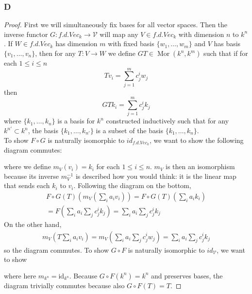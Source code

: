 \documentclass{article}
\newcommand{\id}{\mathrm{id}}
\DeclareMathOperator{\Mor}{\mathrm{Mor}}
\begin{document}
\subsubsection{D}\label{1.2.D}
\begin{proof}
    First we will simultaneously fix bases for all vector spaces. Then the inverse functor $G:f.d.Vec_k\to \mathscr V$ will map any $V\in f.d.Vec_k$ with dimension $n$ to $k^n$. If $W\in f.d.Vec_k$ has dimension $m$ with fixed basis $\{w_1,\dots,w_m\}$ and $V$ has basis $\{v_1,\dots,v_n\}$, then for any $T:V\to W$ we define $GT\in \Mor(k^n,k^m)$ such that if for each $1\le i \le n$
    \[
    Tv_i=\sum_{j=1}^m c^i_j w_j
    \]
    then
    \[
    GTk_i=\sum_{j=1}^m c^i_j k_j
    \]
    where $\{k_1,\dots, k_n\}$ is a basis for $k^n$ constructed inductively such that for any $k^{n'}\subset k^n$, the basis $\{k_1,\dots, k_{n'}\}$ is a subset of the basis $\{k_1,\dots, k_n\}$.\\
    \newline
    To show $F\circ G$ is naturally isomorphic to $id_{f.d.Vec_k}$, we want to show the following diagram commutes:
    \begin{center}
    \end{center}
    where we define $m_V(v_i)=k_i$ for each $1\le i\le n$. $m_V$ is then an isomorphism because its inverse $m_V^{-1}$ is described how you would think: it is the linear map that sends each $k_i$ to $v_i$.  Following the diagram on the bottom,
    \begin{align*}
        F\circ G(T)(m_V(\sum_i a_iv_i))=F\circ G(T)(\sum_i a_ik_i)\\
        =F(\sum_i a_i \sum_j c^i_j k_j)=\sum_i a_i \sum_j c^i_j k_j
    \end{align*}
    On the other hand,
    \begin{align*}
        m_V(T\sum_i a_iv_i)=m_V(\sum_i a_i \sum_j c^i_j w_j)=\sum_i a_i \sum_j c^i_jk_j
    \end{align*}
    so the diagram commutes. To show $G\circ F$ is naturally isomorphic to $id_\mathscr V$, we want to show
    \begin{center}
    \end{center}
    where here $m_{k^n}=\id_{k^n}$. Because $G\circ F(k^n)=k^n$ and preserves bases, the diagram trivially commutes because also $G\circ F(T)=T$.
\end{proof}
\end{document}

